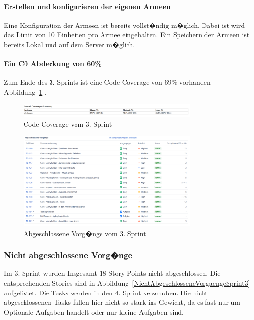 \documentclass[12pt, titlepage]{scrartcl}
\newcommand{\Abb}[1]{%
	Abbildung\ \ref{#1}%
}
\begin{document}
		\paragraph{Erstellen und konfigurieren der eigenen Armeen}
		Eine Konfiguration der Armeen ist bereits vollst�ndig m�glich. Dabei ist wird das Limit von 10 Einheiten pro Armee eingehalten. Ein Speichern der Armeen ist bereits Lokal und auf dem Server m�glich.
		
		\paragraph{Ein C0 Abdeckung von 60\%}
		Zum Ende des 3. Sprints ist eine Code Coverage von 69\% vorhanden \Abb{CodeCoverageSprint3}.
		\begin{figure}[H] 
			\centering
			\includegraphics[width=0.8\textwidth]{Coverage_Sprint_3.PNG}
			\caption{Code Coverage vom 3. Sprint}
			\label{CodeCoverageSprint3}
		\end{figure}
		
		\begin{figure}[H] 
			\centering
			\includegraphics[width=0.8\textwidth]{Abschlossene_Vorgaenge_Sprint_3.png}
			\caption{Abgeschlossene Vorg�nge vom 3. Sprint}
			\label{AbgeschlosseneVorgaengeSprint3}
		\end{figure}
	
		\subsubsection{Nicht abgeschlossene Vorg�nge}
		Im 3. Sprint wurden Insgesamt 18 Story Points nicht abgeschlossen. Die entsprechenden Stories sind in \Abb{NichtAbgeschlosseneVorgaengeSprint3} aufgelistet. Die Tasks werden in den 4. Sprint verschoben. Die nicht abgeschlossenen Tasks fallen hier nicht so stark ins Gewicht, da es fast nur um Optionale Aufgaben handelt oder nur kleine Aufgaben sind.
			
\end{document}
